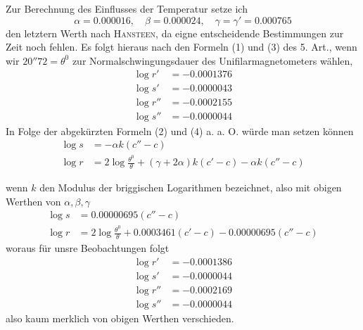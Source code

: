 Zur Berechnung des Einflusses der Temperatur setze ich
\[
\alpha=0.000016,\quad\beta=0.000024,\quad\gamma=\gamma'=0.000765
\]
den letztern Werth nach \textsc{Hansteen}, da eigne entscheidende Bestimmungen zur Zeit noch fehlen. Es folgt hieraus nach den Formeln (1) und (3) des 5. Art., wenn wir $20''72=\theta^0$ zur Normalschwingungsdauer des Unifilarmagnetometers wählen,
\[
\begin{aligned}
\log r'&=-0.0001376\\
\log s'&=-0.0000043\\
\log r''&=-0.0002155\\
\log s''&=-0.0000044
\end{aligned}
\]
In Folge der abgekürzten Formeln (2) und (4) a. a. O. würde man setzen können
\[
\begin{aligned}
\log s&=-\alpha k(c''-c)\\
\log r&=2\log\frac{\theta^0}{\theta}+(\gamma+2\alpha)k(c'-c)-\alpha k(c''-c)
\end{aligned}
\]
\GaussVSourceGathering{53\textsuperscript{*}}
\par\clearpage
{}
\noindent wenn $k$ den Modulus der briggischen Logarithmen bezeichnet, also mit obigen Werthen von $\alpha,\beta,\gamma$
\[
\begin{aligned}
\log s&=0.00000695(c''-c)\\
\log r&=2\log\frac{\theta^0}{\theta}+0.0003461(c'-c)-0.00000695(c''-c)
\end{aligned}
\]
woraus für unsre Beobachtungen folgt
\[
\begin{aligned}
\log r'&=-0.0001386\\
\log s'&=-0.0000044\\
\log r''&=-0.0002169\\
\log s''&=-0.0000044
\end{aligned}
\]
also kaum merklich von obigen Werthen verschieden.

